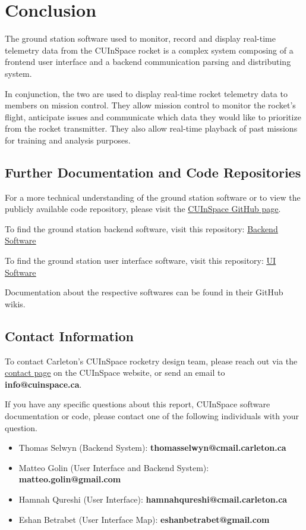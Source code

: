 \sectionfont{\fontsize{14}{14}\selectfont}
\section{Conclusion}

The ground station software used to monitor, record and display real-time telemetry data from the CUInSpace rocket is a
complex system composing of a frontend user interface and a backend communication parsing and distributing system.

In conjunction, the two are used to display real-time rocket telemetry data to members on mission control. They allow
mission control to monitor the rocket's flight, anticipate issues and communicate which data they would like to prioritize from 
the rocket transmitter. They also allow real-time playback of past missions for training and analysis purposes.

\subsection*{Further Documentation and Code Repositories}
For a more technical understanding of the ground station software or to view the publicly available code repository,
please visit the \href{https://github.com/CarletonURocketry}{\underline{CUInSpace GitHub page}}.

To find the ground station backend software, visit this repository:
\href{https://github.com/CarletonURocketry/ground-station}{\underline{Backend Software}}

To find the ground station user interface software, visit this repository:
\href{https://github.com/CarletonURocketry/ground-station-ui}{\underline{UI Software}} 

Documentation about the respective softwares can be found in their GitHub wikis.

\subsection*{Contact Information}

To contact Carleton's CUInSpace rocketry design team, please reach out via the \href{https://www.cuinspace.ca/contact-us}
{\underline{contact page}} on the CUInSpace website, or send an email to \textbf{info@cuinspace.ca}.

If you have any specific questions about this report, CUInSpace software documentation or code, please contact one of the 
following individuals with your question.

\begin{itemize}
    \item Thomas Selwyn (Backend System): \textbf{thomasselwyn@cmail.carleton.ca}
    \item Matteo Golin (User Interface and Backend System): \textbf{matteo.golin@gmail.com}
    \item Hamnah Qureshi (User Interface): \textbf{hamnahqureshi@cmail.carleton.ca}
    \item Eshan Betrabet (User Interface Map): \textbf{eshanbetrabet@gmail.com}
\end{itemize}
